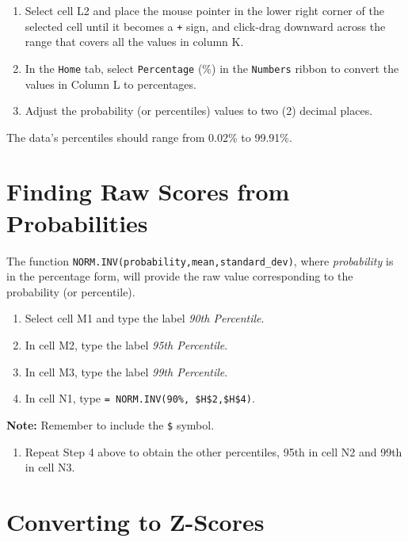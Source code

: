 \documentclass[
]{book}
\providecommand{\tightlist}{%
  \setlength{\itemsep}{0pt}\setlength{\parskip}{0pt}}
\begin{document}
\begin{enumerate}
\def\labelenumi{\arabic{enumi}.}
\setcounter{enumi}{2}
\tightlist
\item
  Select cell L2 and place the mouse pointer in the lower right corner of the selected cell until it becomes a \texttt{+} sign, and click-drag downward across the range that covers all the values in column K.
\item
  In the \texttt{Home} tab, select \texttt{Percentage} (\%) in the \texttt{Numbers} ribbon to convert the values in Column L to percentages.
\item
  Adjust the probability (or percentiles) values to two (2) decimal places.
\end{enumerate}

The data's percentiles should range from 0.02\% to 99.91\%.

\hypertarget{finding-raw-scores-from-probabilities}{%
\section{Finding Raw Scores from Probabilities}\label{finding-raw-scores-from-probabilities}}

The function \texttt{NORM.INV(probability,mean,standard\_dev)}, where \emph{probability} is in the percentage form, will provide the raw value corresponding to the probability (or percentile).

\begin{enumerate}
\def\labelenumi{\arabic{enumi}.}
\tightlist
\item
  Select cell M1 and type the label \emph{90th Percentile}.
\item
  In cell M2, type the label \emph{95th Percentile}.
\item
  In cell M3, type the label \emph{99th Percentile}.
\item
  In cell N1, type \texttt{=\ NORM.INV(90\%,\ \$H\$2,\$H\$4)}.
\end{enumerate}

\textbf{Note:} Remember to include the \texttt{\$} symbol.

\begin{enumerate}
\def\labelenumi{\arabic{enumi}.}
\setcounter{enumi}{4}
\tightlist
\item
  Repeat Step 4 above to obtain the other percentiles, 95th in cell N2 and 99th in cell N3.
\end{enumerate}

\hypertarget{converting-to-z-scores-1}{%
\section{Converting to Z-Scores}\label{converting-to-z-scores-1}}
\end{document}
